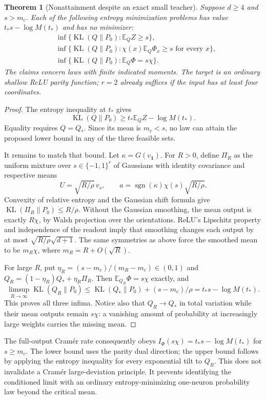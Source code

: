 \documentclass[11pt]{article}
\newtheorem{theorem}{Theorem}
\newcommand{\E}{\mathbb E}
\newcommand{\KL}{\operatorname{KL}}
\begin{document}
\begin{theorem}[Nonattainment despite an exact small teacher]\label{thm:noattain}
Suppose $d\ge4$ and $s>m_c$. Each of the following entropy minimization
problems has value $t_*s-\log M(t_*)$ and has no minimizer:
\begin{align*}
 &\inf\{\KL(Q\|P_0):\E_Q Z\ge s\},\\
 &\inf\{\KL(Q\|P_0):\chi(x)\E_Q\Phi_x\ge s\text{ for every }x\},\\
 &\inf\{\KL(Q\|P_0):\E_Q\Phi=s\chi\}.
\end{align*}
The claims concern laws with finite indicated moments. The target is an
ordinary shallow ReLU parity function; $r=2$ already suffices if the input
has at least four coordinates.
\end{theorem}
\begin{proof}
The entropy inequality at $t_*$ gives
\[
 \KL(Q\|P_0)\ge t_*\E_Q Z-\log M(t_*).
\]
Equality requires $Q=Q_*$. Since its mean is $m_c<s$, no law can attain
the proposed lower bound in any of the three feasible sets.

It remains to match that bound. Let $\kappa=G(v_{\boldsymbol1})$.
For $R>0$, define $\Pi_R$ as the uniform mixture over $s\in\{-1,1\}^r$
of Gaussians with identity covariance and respective means
\[
 U=\sqrt{R/\rho}\,v_s,\qquad
 a=\operatorname{sgn}(\kappa)\chi(s)\sqrt{R/\rho}.
\]
Convexity of relative entropy and the Gaussian shift formula give
$\KL(\Pi_R\|P_0)\le R/\rho$.
Without the Gaussian smoothing, the mean output is exactly $R\chi$,
by Walsh projection over the orientations. ReLU's Lipschitz property
and independence of the readout imply that smoothing changes each output
by at most $\sqrt{R/\rho}\sqrt{d+1}$. The same symmetries as above force
the smoothed mean to be $m_R\chi$, where $m_R=R+O(\sqrt R)$.

For large $R$, put $\eta_R=(s-m_c)/(m_R-m_c)\in(0,1)$ and
$Q_R=(1-\eta_R)Q_*+\eta_R\Pi_R$. Then $\E_{Q_R}\Phi=s\chi$ exactly,
and
\[
 \limsup_{R\to\infty}\KL(Q_R\|P_0)
 \le\KL(Q_*\|P_0)+(s-m_c)/\rho=t_*s-\log M(t_*).
\]
This proves all three infima. Notice also that $Q_R\to Q_*$ in total
variation while their mean outputs remain $s\chi$: a vanishing amount of
probability at increasingly large weights carries the missing mean.
\end{proof}

The full-output Cram\'er rate consequently obeys
$I_{\Phi}(s\chi)=t_*s-\log M(t_*)$ for $s\ge m_c$.
The lower bound uses the parity dual direction; the upper bound follows
by applying the entropy inequality for every exponential tilt to $Q_R$.
This does not invalidate a Cram\'er large-deviation principle. It prevents
identifying the conditioned limit with an ordinary entropy-minimizing
one-neuron probability law beyond the critical mean.





\end{document}
